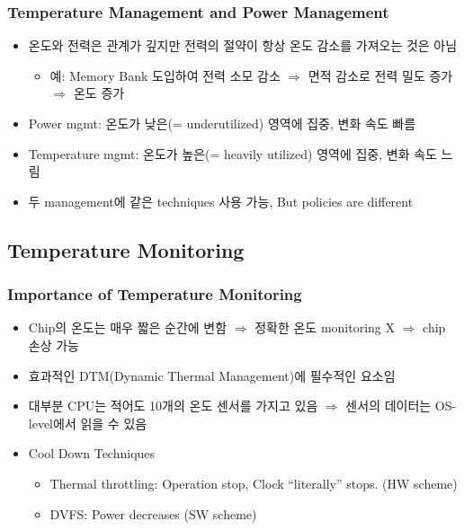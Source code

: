 \subsubsection*{Temperature Management and Power Management}
\begin{itemize}
    \item 온도와 전력은 관계가 깊지만 전력의 절약이 항상 온도 감소를 가져오는 것은 아님
    \begin{itemize}
        \item 예: Memory Bank 도입하여 전력 소모 감소 $\Rightarrow$ 면적 감소로 전력 밀도 증가 $\Rightarrow$ 온도 증가
    \end{itemize}
    \item Power mgmt: 온도가 낮은(= underutilized) 영역에 집중, 변화 속도 빠름
    \item Temperature mgmt: 온도가 높은(= heavily utilized) 영역에 집중, 변화 속도 느림
    \item 두 management에 같은 techniques 사용 가능, But policies are different
\end{itemize}

\subsection{Temperature Monitoring}

\subsubsection*{Importance of Temperature Monitoring}
\begin{itemize}
    \item Chip의 온도는 매우 짧은 순간에 변함 $\Rightarrow$ 정확한 온도 monitoring X $\Rightarrow$ chip 손상 가능
    \item 효과적인 DTM(Dynamic Thermal Management)에 필수적인 요소임
    \item 대부분 CPU는 적어도 10개의 온도 센서를 가지고 있음 $\Rightarrow$ 센서의 데이터는 OS-level에서 읽을 수 있음
    \item Cool Down Techniques
    \begin{itemize}
        \item Thermal throttling: Operation stop, Clock ``literally'' stops. (HW scheme)
        \item DVFS: Power decreases (SW scheme)
    \end{itemize}
\end{itemize}
\pagebreak

